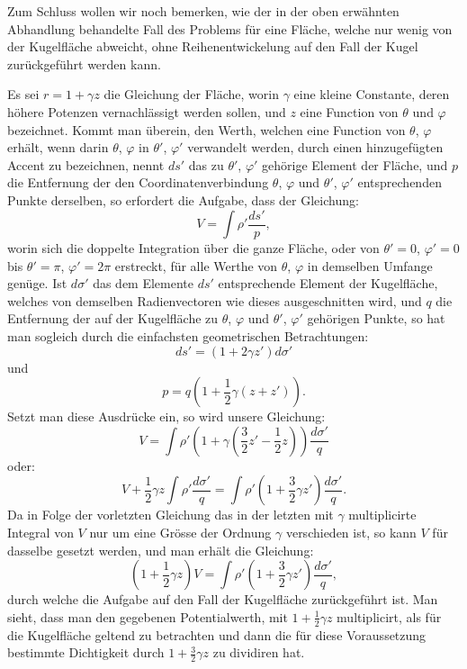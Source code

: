\documentclass[11pt]{article}
\begin{document}
Zum Schluss wollen wir noch bemerken, wie der in der oben erwähnten Abhandlung behandelte Fall des Problems für eine Fläche, welche nur wenig von der Kugelfläche abweicht, ohne Reihenentwickelung auf den Fall der Kugel zurückgeführt werden kann.

Es sei $r=1+\gamma z$ die Gleichung der Fläche, worin $\gamma$ eine kleine Constante, deren höhere Potenzen vernachlässigt werden sollen, und $z$ eine Function von $\theta$ und $\varphi$ bezeichnet. Kommt man überein, den Werth, welchen eine Function von $\theta$, $\varphi$ erhält, wenn darin $\theta$, $\varphi$ in $\theta'$, $\varphi'$ verwandelt werden, durch einen hinzugefügten Accent zu bezeichnen, nennt $ds'$ das zu $\theta'$, $\varphi'$ gehörige Element der Fläche, und $p$ die Entfernung der den Coordinatenverbindung $\theta$, $\varphi$ und $\theta'$, $\varphi'$ entsprechenden Punkte derselben, so erfordert die Aufgabe, dass der Gleichung:
\[
 V=\int \rho'\frac{ds'}{p},
\]
worin sich die doppelte Integration über die ganze Fläche, oder von $\theta'=0$, $\varphi'=0$ bis $\theta'=\pi$, $\varphi'=2\pi$ erstreckt, für alle Werthe von $\theta$, $\varphi$ in demselben Umfange genüge. Ist $d\sigma'$ das dem Elemente $ds'$ entsprechende Element der Kugelfläche, welches von demselben Radienvectoren wie dieses ausgeschnitten wird, und $q$ die Entfernung der auf der Kugelfläche zu $\theta$, $\varphi$ und $\theta'$, $\varphi'$ gehörigen Punkte, so hat man sogleich durch die einfachsten geometrischen Betrachtungen:
\[
 ds'=(1+2\gamma z')d\sigma'
\]
und
\[
 p=q\left(1+\frac12\gamma(z+z')\right).
\]
Setzt man diese Ausdrücke ein, so wird unsere Gleichung:
\[
 V=\int \rho'\left(1+\gamma\left(\frac32z'-\frac12z\right)\right)\frac{d\sigma'}{q}
\]
oder:
\[
 V+\frac12\gamma z\int \rho'\frac{d\sigma'}{q}
 =\int \rho'\left(1+\frac32\gamma z'\right)\frac{d\sigma'}{q}.
\]
Da in Folge der vorletzten Gleichung das in der letzten mit $\gamma$ multiplicirte Integral von $V$ nur um eine Grösse der Ordnung $\gamma$ verschieden ist, so kann $V$ für dasselbe gesetzt werden, und man erhält die Gleichung:
\[
 \left(1+\frac12\gamma z\right)V=\int \rho'\left(1+\frac32\gamma z'\right)\frac{d\sigma'}{q},
\]
durch welche die Aufgabe auf den Fall der Kugelfläche zurückgeführt ist. Man sieht, dass man den gegebenen Potentialwerth, mit $1+\frac12\gamma z$ multiplicirt, als für die Kugelfläche geltend zu betrachten und dann die für diese Voraussetzung bestimmte Dichtigkeit durch $1+\frac32\gamma z$ zu dividiren hat.
\end{document}
